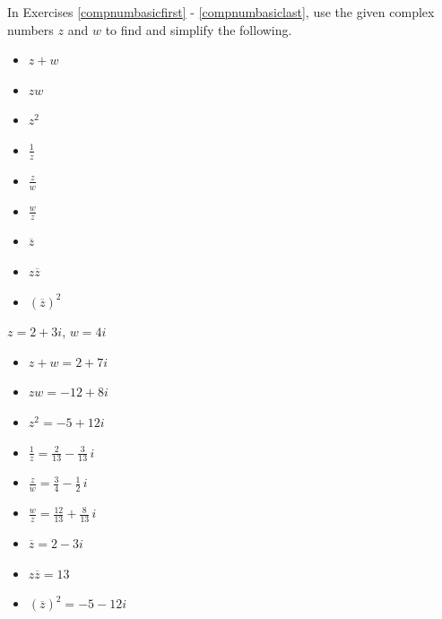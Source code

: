\documentclass{ximera}
\begin{document}
	\author{Stitz-Zeager}



\label{ExercisesforAppCmpNums}

\begin{question}
In Exercises \ref{compnumbasicfirst} - \ref{compnumbasiclast}, use the given complex numbers $z$ and $w$ to find and simplify the following. 

\begin{itemize}

\item $z+w$
\item $zw$
\item $z^2$
\item $\frac{1}{z}$
\item $\frac{z}{w}$
\item $\frac{w}{z}$
\item $\overline{z}$
\item $z\overline{z}$
\item $(\overline{z})^2$
\end{itemize}

\begin{problem} \label{compnumbasicfirst}
$z = 2+3i$, $w = 4i$ 

\begin{solution}

\begin{itemize}
\item $z+w = 2+7i$

\item $zw = -12+8i$

\item $z^2 = -5 + 12i$

\item $\frac{1}{z} = \frac{2}{13} - \frac{3}{13} \, i$

\item $\frac{z}{w} = \frac{3}{4} - \frac{1}{2} \, i$

\item $\frac{w}{z} = \frac{12}{13} + \frac{8}{13} \,i$

\item $\overline{z} = 2-3i$

\item $z\overline{z} = 13$

\item $(\overline{z})^2 = -5-12i$


\end{itemize}
\end{solution}
\end{problem}
\end{question}
\end{document}
